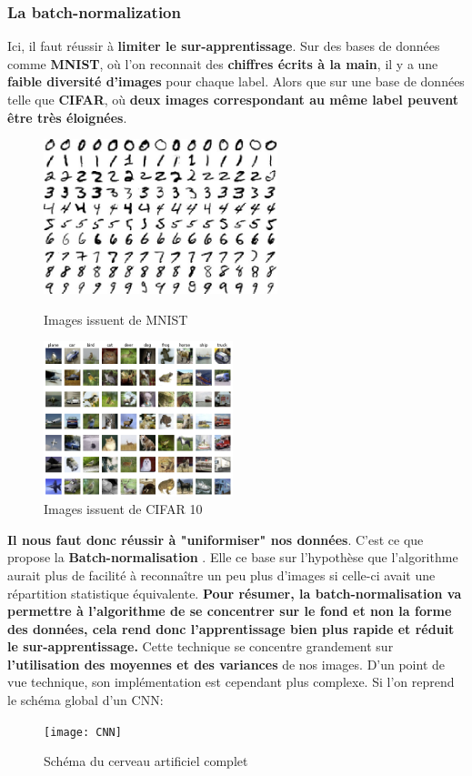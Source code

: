 \documentclass[12pt,a4paper]{extarticle}
\begin{document}
\subsubsection*{La batch-normalization}
Ici, il faut réussir à \textbf{limiter le sur-apprentissage}. Sur des bases de données comme \textbf{MNIST}, où l'on reconnait des \textbf{chiffres écrits à la main}, il y a une \textbf{faible diversité d'images} pour chaque label. Alors que sur une base de données telle que \textbf{CIFAR}, où \textbf{deux images correspondant au même label peuvent être très éloignées}. 
 \begin{figure}[h]
    \begin{minipage}[c]{.46\linewidth}
        \centering
        \includegraphics[height=4.5cm]{mnist_exemple}
        \caption{Images issuent de MNIST}
    \end{minipage}
    \hfill%
    \begin{minipage}[c]{.46\linewidth}
        \centering
        \includegraphics[height=4.5cm]{CIFAR-10_examples}
        \caption{Images issuent de CIFAR 10}
    \end{minipage}
\end{figure}

\textbf{ Il nous faut donc réussir à "uniformiser" nos données}. C'est ce que propose la \textbf{Batch-normalisation} \cite{bn}. Elle ce base sur l'hypothèse que l'algorithme aurait plus de facilité à reconnaître un peu plus d'images si celle-ci avait une répartition statistique équivalente. \textbf{Pour résumer, la batch-normalisation va permettre à l'algorithme de se concentrer sur le fond et non la forme des données, cela rend donc l'apprentissage bien plus rapide et réduit le sur-apprentissage.} Cette technique se concentre grandement sur \textbf{l'utilisation des moyennes et des variances} de nos images. D'un point de vue technique, son implémentation est cependant plus complexe. Si l'on reprend le schéma global d'un CNN:
 \begin{figure}[h]
\centering
\texttt{[image: CNN]}
\caption{Schéma du cerveau artificiel complet}
\end{figure}
\end{document}
